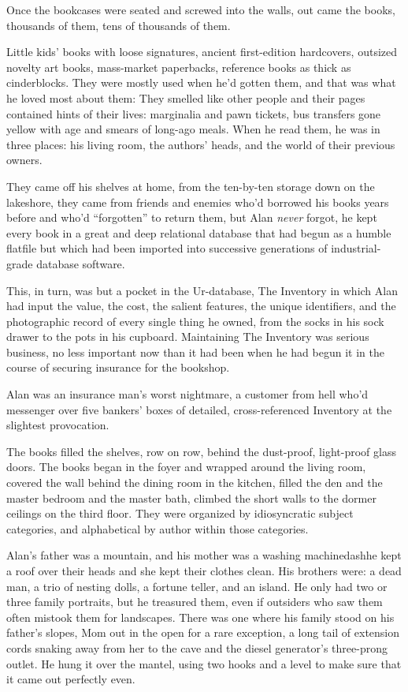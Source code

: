 Once the bookcases were seated and screwed into the walls, out came
the books, thousands of them, tens of thousands of them.

Little kids' books with loose signatures, ancient first-edition
hardcovers, outsized novelty art books, mass-market paperbacks,
reference books as thick as cinderblocks.  They were mostly used when
he'd gotten them, and that was what he loved most about them:  They
smelled like other people and their pages contained hints of their
lives:  marginalia and pawn tickets, bus transfers gone yellow with
age and smears of long-ago meals.  When he read them, he was in three
places:  his living room, the authors' heads, and the world of their
previous owners.

They came off his shelves at home, from the ten-by-ten storage down on
the lakeshore, they came from friends and enemies who'd borrowed his
books years before and who'd ``forgotten'' to return them, but Alan
\textit{never} forgot, he kept every book in a great and deep
relational database that had begun as a humble flatfile but which had
been imported into successive generations of industrial-grade database
software.

This, in turn, was but a pocket in the Ur-database, The Inventory in
which Alan had input the value, the cost, the salient features, the
unique identifiers, and the photographic record of every single thing
he owned, from the socks in his sock drawer to the pots in his
cupboard.  Maintaining The Inventory was serious business, no less
important now than it had been when he had begun it in the course of
securing insurance for the bookshop.

Alan was an insurance man's worst nightmare, a customer from hell
who'd messenger over five bankers' boxes of detailed, cross-referenced
Inventory at the slightest provocation.

The books filled the shelves, row on row, behind the dust-proof,
light-proof glass doors.  The books began in the foyer and wrapped
around the living room, covered the wall behind the dining room in the
kitchen, filled the den and the master bedroom and the master bath,
climbed the short walls to the dormer ceilings on the third floor. 
They were organized by idiosyncratic subject categories, and
alphabetical by author within those categories.

Alan's father was a mountain, and his mother was a washing
machinedash{}he kept a roof over their heads and she kept their clothes
clean.  His brothers were:  a dead man, a trio of nesting dolls, a
fortune teller, and an island.  He only had two or three family
portraits, but he treasured them, even if outsiders who saw them often
mistook them for landscapes.  There was one where his family stood on
his father's slopes, Mom out in the open for a rare exception, a long
tail of extension cords snaking away from her to the cave and the
diesel generator's three-prong outlet.  He hung it over the mantel,
using two hooks and a level to make sure that it came out perfectly
even.


